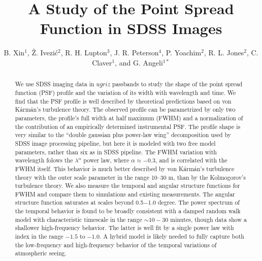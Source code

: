 \documentclass[12pt,preprint]{aastex}
\newcommand{\vk}{von K\'{a}rm\'{a}n}
\begin{document}
\title{A Study of the Point Spread Function in SDSS Images}    %

\author{B. Xin$^1$, \v{Z}. Ivezi\'{c}$^2$, R. H. Lupton$^3$,  J. R. Peterson$^4$, P. Yoachim$^2$, 
R. L. Jones$^2$, C. Claver$^1$, and G. Angeli$^{1*}$}


\begin{abstract}
We use SDSS imaging data in $ugriz$ passbands to study the shape of the
point spread function (PSF) profile and the variation of its width with 
wavelength and time. We find that the PSF profile is well described by 
theoretical predictions based on \vk's turbulence theory. The observed 
profile can be parametrized by only two parameters, the profile's full width
at half maximum (FWHM) and a normalization of the contribution of an empirically determined 
instrumental PSF. The profile shape is very similar to the ``double gaussian
plus power-law wing'' decomposition used by SDSS image processing pipeline, 
but here it is modeled with two free model parameters, rather than six as in SDSS pipeline. 
The FWHM variation with wavelength folows the
$\lambda^{\alpha}$ power law, where $\alpha \approx-0.3$, and is correlated
with the FWHM itself. This behavior is much better described by \vk's turbulence 
theory with the outer scale parameter in the range 10--30 m, than by the 
Kolmogorov's turbulence theory. We also measure the temporal and angular
structure functions for FWHM and compare them to simulations and
existing measurements. The angular structure function saturates at scales beyond 0.5$-$1.0 degree. 
The power spectrum of the temporal behavior is found to be broadly consistent with 
a damped random walk model with characteristic timescale in the range $\sim10-30$ minutes, 
though data show a shallower high-frequency behavior. The latter is well fit 
by a single power law with index in the range $-1.5$ to $-1.0$. A hybrid model 
is likely needed to fully capture both the low-frequency and high-frequency 
behavior of the temporal variations of atmospheric seeing. 
\end{abstract}
\end{document}
